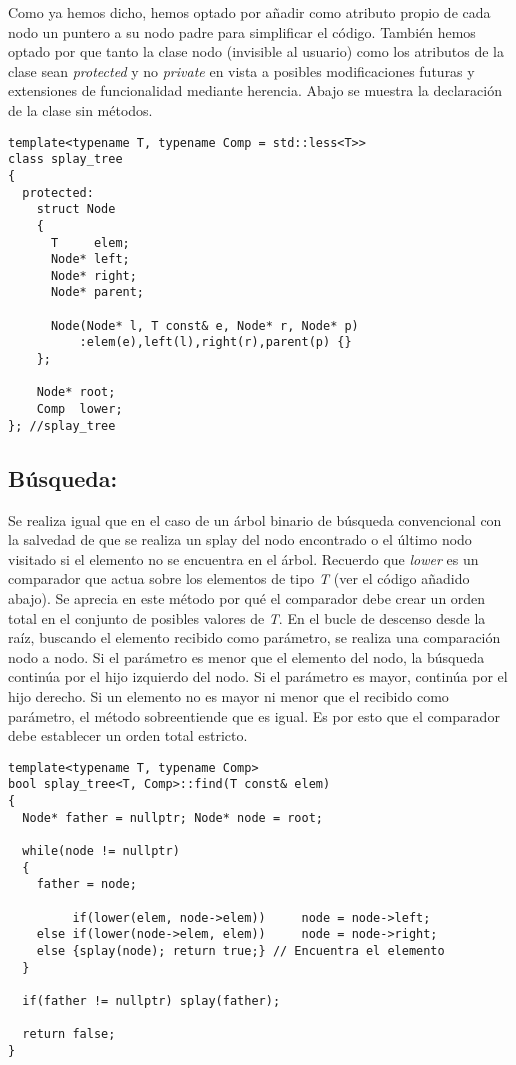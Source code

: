 \documentclass[letterpaper,12pt]{article}
\begin{document}
Como ya hemos dicho, hemos optado por añadir como atributo propio de cada nodo
un puntero a su nodo padre para simplificar el código. También hemos optado
por que tanto la clase nodo (invisible al usuario) como los atributos de la 
clase sean \textit{protected} y no \textit{private} en vista a posibles 
modificaciones futuras y extensiones de funcionalidad mediante herencia. Abajo
se muestra la declaración de la clase sin métodos.

\begin{lstlisting}
template<typename T, typename Comp = std::less<T>>
class splay_tree
{
  protected:
    struct Node
    {
      T     elem;
      Node* left;
      Node* right;
      Node* parent;

      Node(Node* l, T const& e, Node* r, Node* p) 
          :elem(e),left(l),right(r),parent(p) {}
    };

    Node* root;
    Comp  lower;
}; //splay_tree
\end{lstlisting}
\subsection{Búsqueda:}

Se realiza igual que en el caso de un árbol binario de búsqueda convencional 
con la salvedad de que se realiza un splay del nodo encontrado o el último 
nodo visitado si el elemento no se encuentra en el árbol. Recuerdo que 
\textit{lower} es un comparador que actua sobre los elementos de tipo 
\textit{T} (ver el código añadido abajo). Se aprecia en este método por qué el 
comparador debe crear un orden total en el conjunto de posibles valores de 
\textit{T}. En el bucle de descenso desde la raíz, buscando el elemento 
recibido como parámetro, se realiza una comparación nodo a nodo. Si el 
parámetro es menor que el elemento del nodo, la búsqueda continúa por el hijo 
izquierdo del nodo. Si el parámetro es mayor, continúa por el hijo derecho. Si 
un elemento no es mayor ni menor que el recibido como parámetro, el método 
sobreentiende que es igual. Es por esto que el comparador debe establecer un 
orden total estricto. 

\begin{lstlisting}
template<typename T, typename Comp>
bool splay_tree<T, Comp>::find(T const& elem)
{
  Node* father = nullptr; Node* node = root;

  while(node != nullptr)
  {
    father = node;

         if(lower(elem, node->elem))     node = node->left;
    else if(lower(node->elem, elem))     node = node->right;
    else {splay(node); return true;} // Encuentra el elemento
  }

  if(father != nullptr) splay(father);

  return false;
}
\end{lstlisting}
\end{document}
